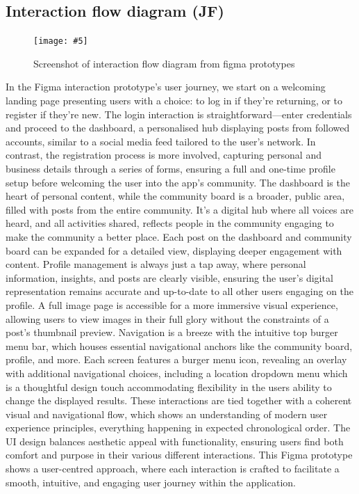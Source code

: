 \documentclass[a4paper,12pt]{article}
\newcommand{\includescalefigure}[5]{
\begin{figure}[H]
\centering
\texttt{[image: \#5]}
\captionsetup{width=.8\linewidth} 
\caption[#2]{#3}
\label{#1}
\end{figure}
}
\begin{document}
\subsection{Interaction flow diagram (JF)}
\includescalefigure{fig:interaction_flow}{Interaction Flow Diagram}{Screenshot of interaction flow diagram from figma prototypes}{0.95}{"figma/Interactions.png"}
In the Figma interaction prototype's user journey, we start on a welcoming landing page presenting users with a choice: to log in if they're returning, or to register if they're new. The login interaction is straightforward—enter credentials and proceed to the dashboard, a personalised hub displaying posts from followed accounts, similar to a social media feed tailored to the user's network. In contrast, the registration process is more involved, capturing personal and business details through a series of forms, ensuring a full and one-time profile setup before welcoming the user into the app's community.
The dashboard is the heart of personal content, while the community board is a broader, public area, filled with posts from the entire community. It's a digital hub where all voices are heard, and all activities shared, reflects people in the community engaging to make the community a better place. Each post on the dashboard and community board can be expanded for a detailed view, displaying deeper engagement with content.
Profile management is always just a tap away, where personal information, insights, and posts are clearly visible, ensuring the user's digital representation remains accurate and up-to-date to all other users engaging on the profile. A full image page is accessible for a more immersive visual experience, allowing users to view images in their full glory without the constraints of a post's thumbnail preview.
Navigation is a breeze with the intuitive top burger menu bar, which houses essential navigational anchors like the community board, profile, and more. Each screen features a burger menu icon, revealing an overlay with additional navigational choices, including a location dropdown menu which is a thoughtful design touch accommodating flexibility in the users ability to change the displayed results.
These interactions are tied together with a coherent visual and navigational flow, which shows an understanding of modern user experience principles, everything happening in expected chronological order. The UI design balances aesthetic appeal with functionality, ensuring users find both comfort and purpose in their various different interactions. This Figma prototype shows a user-centred approach, where each interaction is crafted to facilitate a smooth, intuitive, and engaging user journey within the application.
\end{document}
